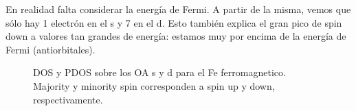   En realidad falta considerar la energía de Fermi. A partir de la misma, vemos que sólo hay 1 electrón en el s y 7 en el d. Esto también explica el gran pico de spin down a valores tan grandes de energía: estamos muy por encima de la energía de Fermi (antiorbitales).

  \begin{figure}[H]
      \centering
      \caption{DOS y PDOS sobre los OA s y d para el Fe ferromagnetico. Majority y minority spin corresponden a spin up y down, respectivamente.}
  \end{figure}

